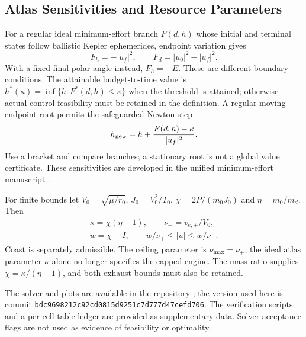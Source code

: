 \documentclass[journal,a4paper]{IEEEtran}
\begin{document}
\subsection{Atlas Sensitivities and Resource Parameters}
For a regular ideal minimum-effort branch $F(d,h)$ whose initial and
terminal states follow ballistic Kepler ephemerides, endpoint variation gives
\begin{equation}
 F_h=-|u_f|^2,\qquad F_d=|u_0|^2-|u_f|^2.
\end{equation}
With a fixed final polar angle instead, $F_h=-E$. These are different
boundary conditions. The attainable budget-to-time value is
$h^*(\kappa)=\inf\{h:F^*(d,h)\le\kappa\}$ when the threshold is attained;
otherwise actual control feasibility must be retained in the definition.
A regular moving-endpoint root permits the safeguarded Newton step
\begin{equation}
 h_{\rm new}=h+\frac{F(d,h)-\kappa}{|u_f|^2}.
\end{equation}
Use a bracket and compare branches; a stationary root is not a global
value certificate. These sensitivities are developed in the unified
minimum-effort manuscript \cite{OlsinaMinimumEffort}.

For finite bounds let $V_0=\sqrt{\mu/r_0}$, $J_0=V_0^2/T_0$,
$\chi=2P/(m_0J_0)$ and $\eta=m_0/m_d$. Then
\begin{equation}
\begin{gathered}
 \kappa=\chi(\eta-1),\qquad \nu_\pm=v_{e,\pm}/V_0,\\
 w=\chi+I,\qquad w/\nu_+\le|u|\le w/\nu_-.
\end{gathered}
\end{equation}
Coast is separately admissible. The ceiling parameter is
$\nu_{\max}=\nu_+$; the ideal atlas parameter $\kappa$ alone no longer
specifies the capped engine. The mass ratio supplies
$\chi=\kappa/(\eta-1)$, and both exhaust bounds must also be retained.

The solver and plots are available in the repository \cite{Olsina2025};
the version used here is commit
\nolinkurl{bdc9698212c92cd0815d9251c7d777d47cefd706}.
The verification scripts and a per-cell table ledger are provided as
supplementary data. Solver acceptance flags are not used as
evidence of feasibility or optimality.
\end{document}
